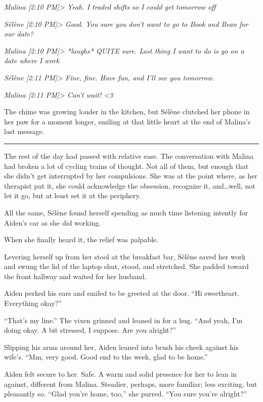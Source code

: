 \emph{Malina {[}2:10 PM{]}\textgreater{} Yeah. I traded shifts so I could get tomorrow off}

\emph{Sélène {[}2:10 PM{]}\textgreater{} Good. You sure you don't want to go to Book and Bean for our date?}

\emph{Malina {[}2:10 PM{]}\textgreater{} *laughs* QUITE sure. Last thing I want to do is go on a date where I work}

\emph{Sélène {[}2:11 PM{]}\textgreater{} Fine, fine. Have fun, and I'll see you tomorrow.}

\emph{Malina {[}2:11 PM{]}\textgreater{} Can't wait! \textless{}3}

The chime was growing louder in the kitchen, but Sélène clutched her phone in her paw for a moment longer, smiling at that little heart at the end of Malina's last message.

\begin{center}\rule{0.5\linewidth}{\linethickness}\end{center}

The rest of the day had passed with relative ease. The conversation with Malina had broken a lot of cycling trains of thought. Not all of them, but enough that she didn't get interrupted by her compulsions. She was at the point where, as her therapist put it, she could acknowledge the obsession, recognize it, and\ldots{}well, not let it go, but at least set it at the periphery.

All the same, Sélène found herself spending as much time listening intently for Aiden's car as she did working.

When she finally heard it, the relief was palpable.

Levering herself up from her stool at the breakfast bar, Sélène saved her work and swung the lid of the laptop shut, stood, and stretched. She padded toward the front hallway and waited for her husband.

Aiden perked his ears and smiled to be greeted at the door. ``Hi sweetheart. Everything okay?''

``That's my line.'' The vixen grinned and leaned in for a hug. ``And yeah, I'm doing okay. A bit stressed, I suppose. Are you alright?''

Slipping his arms around her, Aiden leaned into brush his cheek against his wife's. ``Mm, very good. Good end to the week, glad to be home.''

Aiden felt secure to her. Safe. A warm and solid presence for her to lean in against, different from Malina. Steadier, perhaps, more familiar; less exciting, but pleasantly so. ``Glad you're home, too,'' she purred. ``You sure you're alright?''

